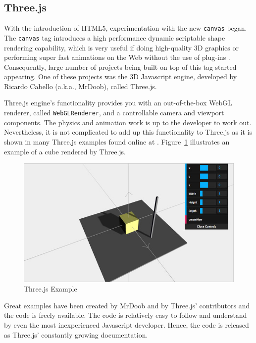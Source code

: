 \subsection{Three.js}

With the introduction of HTML5, experimentation with the new \texttt{canvas} began. The \texttt{canvas} tag introduces a high performance dynamic scriptable shape rendering capability, which is very useful if doing high-quality 3D graphics or performing super fast animations on the Web without the use of plug-ins \cite{wiki:webgl}. Consequently, large number of projects being built on top of this tag started appearing. One of these projects was the 3D Javascript engine, developed by Ricardo Cabello (a.k.a., MrDoob), called Three.js.  

Three.js engine's functionality provides you with an out-of-the-box WebGL renderer, called \texttt{WebGLRenderer}, and a controllable camera and viewport components. The physics and animation work is up to the developer to work out. Nevertheless, it is not complicated to add up this functionality to Three.js as it is shown in many Three.js examples found online at \cite{threeJS}. Figure~\ref{fig:threejs} illustrates an example of a cube rendered by Three.js.

\begin{figure}
	\center
	\includegraphics[scale=0.45]{images/basicsThreeJS.png}
	\caption{Three.js Example}
	\label{fig:threejs}
\end{figure}


Great examples have been created by MrDoob and by Three.js' contributors and the code is freely available. The code is relatively easy to follow and understand by even the most inexperienced Javascript developer. Hence, the code is released as Three.js' constantly growing documentation. 

